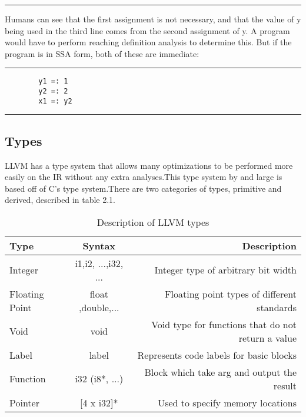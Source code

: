 \documentclass{book}
\begin{document}
    \noindent\rule{12cm}{0.4pt} \linebreak
	
	Humans can see that the first assignment is not necessary, and that the value of y being used in the third line comes from the second assignment of y. A program would have to perform reaching definition analysis to determine this. But if the program is in SSA form, both of these are immediate: \newline
	
    \noindent\rule{12cm}{0.4pt}
	
	\begin{verbatim}
		y1 =: 1
		y2 =: 2
		x1 =: y2
	\end{verbatim}

    \noindent\rule{12cm}{0.4pt} \linebreak
    
    \subsection{Types}
    
    LLVM has a type system that allows many optimizations to be performed more easily on the IR without any extra analyses.This type system by and large is based off of C's type system.There are two categories of types, primitive and derived, described in table 2.1.\newline
    
   
    \begin{table}[h!]
    	\begin{center}
    		\label{tab:Table 2.1.}
    		\begin{tabular}{l|c|r} 
    			\hline
    			\textbf{Type} & \textbf{Syntax} & \textbf{Description}\\
    			\hline
    			Integer & i1,i2, ...,i32, ... & Integer type of arbitrary bit width\\
    			Floating Point & float ,double,... & Floating point types of different standards \\
    			Void & void & Void type for functions that do not return a value \\
    			Label & label & Represents code labels for basic blocks \\
    			\hline
    			Function & i32 (i8*, ...) & Block which take arg and output the result\\
    			Pointer & [4 x i32]* & Used to specify memory locations\\
    			\hline
    		\end{tabular}
    		\caption{Description of LLVM types}
    	\end{center}
    \end{table}
\end{document}

